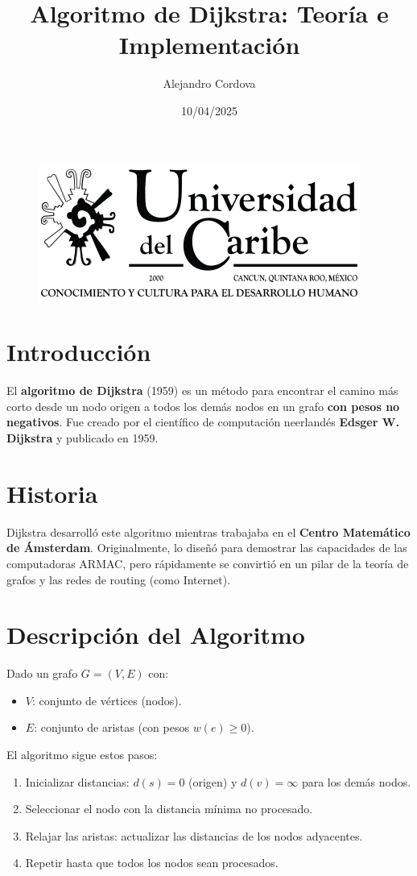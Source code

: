 \documentclass{article}
\begin{document}
\begin{figure}
    \centering
    \includegraphics[width=1\linewidth]{image.png}
    \label{fig:enter-label}
\end{figure}

\title{Algoritmo de Dijkstra: Teoría e Implementación}
\author{Alejandro Cordova}
\date{10/04/2025}

\newpage

\section{Introducción}
El \textbf{algoritmo de Dijkstra} (1959) es un método para encontrar el camino más corto desde un nodo origen a todos los demás nodos en un grafo \textbf{con pesos no negativos}. Fue creado por el científico de computación neerlandés \textbf{Edsger W. Dijkstra} y publicado en 1959.

\section{Historia}
Dijkstra desarrolló este algoritmo mientras trabajaba en el \textbf{Centro Matemático de Ámsterdam}. Originalmente, lo diseñó para demostrar las capacidades de las computadoras ARMAC, pero rápidamente se convirtió en un pilar de la teoría de grafos y las redes de routing (como Internet).


\newpage
\section{Descripción del Algoritmo}
Dado un grafo $G = (V, E)$ con:
\begin{itemize}
    \item $V$: conjunto de vértices (nodos).
    \item $E$: conjunto de aristas (con pesos $w(e) \geq 0$).
\end{itemize}

El algoritmo sigue estos pasos:
\begin{enumerate}
    \item Inicializar distancias: $d(s) = 0$ (origen) y $d(v) = \infty$ para los demás nodos.
    \item Seleccionar el nodo con la distancia mínima no procesado.
    \item Relajar las aristas: actualizar las distancias de los nodos adyacentes.
    \item Repetir hasta que todos los nodos sean procesados.
\end{enumerate}
\end{document}
